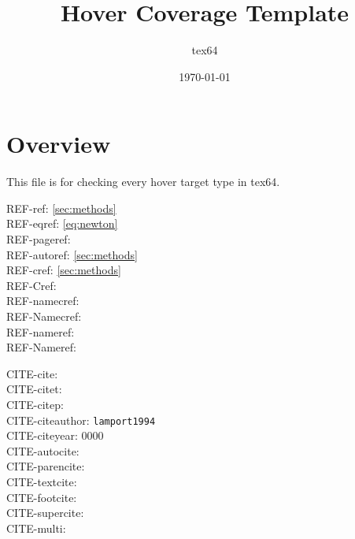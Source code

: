 \documentclass[a4paper]{article}
\title{Hover Coverage Template}
\author{tex64}
\date{\today}
\providecommand{\Namecref}[1]{\namecref{#1}}
\providecommand{\citet}[1]{\cite{#1}}
\providecommand{\citep}[1]{\cite{#1}}
\providecommand{\citeauthor}[1]{\texttt{#1}}
\providecommand{\citeyear}[1]{0000}
\providecommand{\autocite}[1]{\cite{#1}}
\providecommand{\parencite}[1]{\cite{#1}}
\providecommand{\textcite}[1]{\cite{#1}}
\providecommand{\footcite}[1]{\cite{#1}}
\providecommand{\supercite}[1]{\cite{#1}}
\begin{document}
\maketitle
\tableofcontents

\section{Overview}\label{sec:overview}
This file is for checking every hover target type in tex64.


REF-ref: \ref{sec:methods} \\
REF-eqref: \eqref{eq:newton} \\
REF-pageref: \pageref{sec:methods} \\
REF-autoref: \autoref{sec:methods} \\
REF-cref: \cref{sec:methods} \\
REF-Cref:  \\
REF-namecref:  \\
REF-Namecref: \Namecref{sec:methods} \\
REF-nameref:  \\
REF-Nameref: 

CITE-cite: \cite{lamport1994} \\
CITE-citet: \citet{lamport1994} \\
CITE-citep: \citep{knuth1984} \\
CITE-citeauthor: \citeauthor{lamport1994} \\
CITE-citeyear: \citeyear{lamport1994} \\
CITE-autocite: \autocite{lamport1994} \\
CITE-parencite: \parencite{knuth1984} \\
CITE-textcite: \textcite{lamport1994} \\
CITE-footcite: \footcite{lamport1994} \\
CITE-supercite: \supercite{knuth1984} \\
CITE-multi: \cite[see]{knuth1984,lamport1994}

\end{document}

